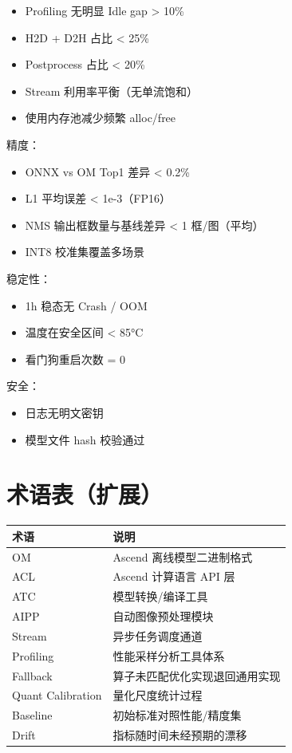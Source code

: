 \begin{itemize}
\tightlist
\item[$\square$]
  Profiling 无明显 Idle gap \textgreater{} 10\%
\item[$\square$]
  H2D + D2H 占比 \textless{} 25\%
\item[$\square$]
  Postprocess 占比 \textless{} 20\%
\item[$\square$]
  Stream 利用率平衡（无单流饱和）
\item[$\square$]
  使用内存池减少频繁 alloc/free
\end{itemize}

精度：

\begin{itemize}
\tightlist
\item[$\square$]
  ONNX vs OM Top1 差异 \textless{} 0.2\%
\item[$\square$]
  L1 平均误差 \textless{} 1e-3（FP16）
\item[$\square$]
  NMS 输出框数量与基线差异 \textless{} 1 框/图（平均）
\item[$\square$]
  INT8 校准集覆盖多场景
\end{itemize}

稳定性：

\begin{itemize}
\tightlist
\item[$\square$]
  1h 稳态无 Crash / OOM
\item[$\square$]
  温度在安全区间 \textless{} 85°C
\item[$\square$]
  看门狗重启次数 = 0
\end{itemize}

安全：

\begin{itemize}
\tightlist
\item[$\square$]
  日志无明文密钥
\item[$\square$]
  模型文件 hash 校验通过
\end{itemize}

\section{术语表（扩展）}\label{src-appendix-appendix6-h8}

\begin{longtable}[]{@{}ll@{}}
\toprule\noalign{}
术语 & 说明 \\
\midrule\noalign{}
\endhead
\bottomrule\noalign{}
\endlastfoot
OM & Ascend 离线模型二进制格式 \\
ACL & Ascend 计算语言 API 层 \\
ATC & 模型转换/编译工具 \\
AIPP & 自动图像预处理模块 \\
Stream & 异步任务调度通道 \\
Profiling & 性能采样分析工具体系 \\
Fallback & 算子未匹配优化实现退回通用实现 \\
Quant Calibration & 量化尺度统计过程 \\
Baseline & 初始标准对照性能/精度集 \\
Drift & 指标随时间未经预期的漂移 \\
\end{longtable}

